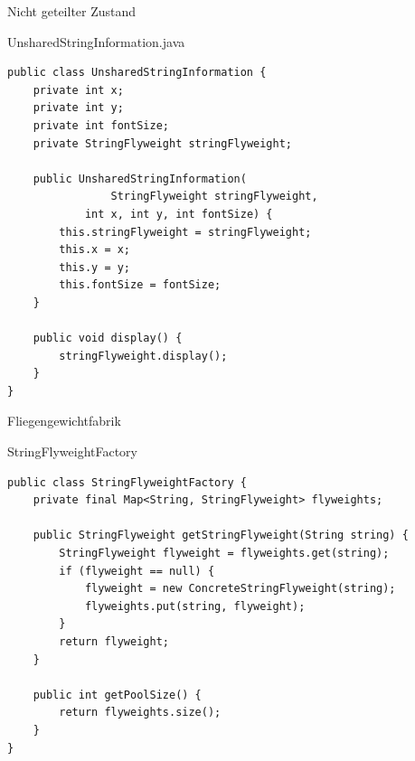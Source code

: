 \begin{frame}[fragile]{Nicht geteilter Zustand}
	\begin{exampleblock}{UnsharedStringInformation.java}
 		\begin{lstlisting}
public class UnsharedStringInformation {
	private int x;
	private int y;
	private int fontSize;
	private StringFlyweight stringFlyweight;
	
	public UnsharedStringInformation(
                StringFlyweight stringFlyweight, 
			int x, int y, int fontSize) {
		this.stringFlyweight = stringFlyweight;
		this.x = x;
		this.y = y;
		this.fontSize = fontSize;
	}
	
	public void display() {
		stringFlyweight.display();
	}
}
 		\end{lstlisting}
 	\end{exampleblock}
\end{frame}

\begin{frame}[fragile]{Fliegengewichtfabrik}
	\begin{exampleblock}{StringFlyweightFactory}
 		\begin{lstlisting}
public class StringFlyweightFactory {
    private final Map<String, StringFlyweight> flyweights;

    public StringFlyweight getStringFlyweight(String string) {
    	StringFlyweight flyweight = flyweights.get(string);
        if (flyweight == null) {
            flyweight = new ConcreteStringFlyweight(string);
            flyweights.put(string, flyweight);
        }
        return flyweight;
    }

    public int getPoolSize() {
        return flyweights.size();
    }
} 		    
 		\end{lstlisting}
 	\end{exampleblock}
\end{frame}
